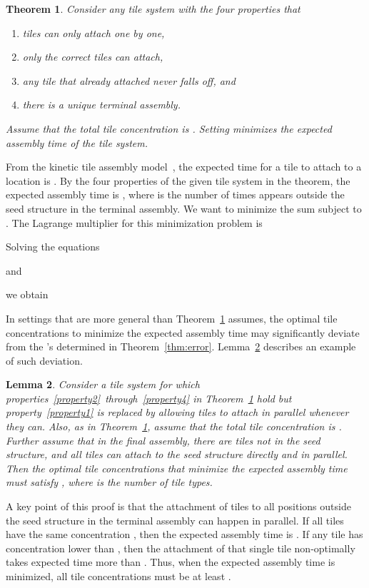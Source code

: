 \documentclass[11pt]{article}
\newtheorem{theorem}{Theorem}
\newtheorem{lemma}[theorem]{Lemma}
\newenvironment{proof}{{\bf Proof:}}{\par}
\begin{document}
\begin{theorem}
\label{thm:time}
Consider any tile system with the four properties that 
\begin{enumerate}
\item tiles can only attach one by one,
\label{property1}
\item only the correct tiles can attach,
\label{property2}
\item any tile that already attached never falls off, and 
\label{property3}
\item there is a unique terminal assembly.
\label{property4}
\end{enumerate}
Assume that the total tile concentration is . Setting  minimizes the expected assembly time of the tile system.
\end{theorem}
\begin{proof}
From the kinetic tile assembly model~\cite{w98:phd}, the expected time for a tile  to attach to a location  is . By the four properties of the given tile system in the theorem, the expected assembly time is , where  is the number of times  appears outside the seed structure in the terminal assembly. We want to minimize the sum  subject to . 
The Lagrange multiplier for this minimization problem is

Solving the equations

and

we obtain

\end{proof}


In settings that are more general than Theorem~\ref{thm:time} assumes, the optimal tile concentrations to minimize the expected assembly time may significantly deviate from the 's determined in Theorem~\ref{thm:error}. Lemma~\ref{lem:example} describes an example of such deviation.

\begin{lemma}
\label{lem:example}
Consider a tile system for which properties~\ref{property2}~through~\ref{property4} in Theorem~\ref{thm:time} hold but property~\ref{property1} is replaced by allowing tiles to attach in parallel whenever they can. Also, as in Theorem~\ref{thm:time}, assume that the total tile concentration is . Further assume that in the final assembly, there are  tiles not in the seed structure, and all  tiles can attach to the seed structure directly and in parallel. Then the optimal tile concentrations that minimize the expected assembly time must satisfy , where  is the number of tile types.
\end{lemma}
\begin{proof}
A key point of this proof is that the attachment of tiles to all  positions outside the seed structure in the terminal assembly can happen in parallel. If all tiles have the same concentration , then the expected assembly time is . If any tile has concentration lower than , then the attachment of that single tile non-optimally takes expected time more than . Thus, when the expected assembly time is minimized, all tile concentrations must be at least .
\end{proof}
\end{document}
